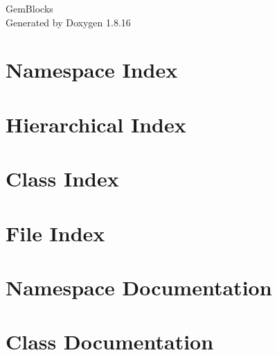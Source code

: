 \let\mypdfximage\pdfximage\def\pdfximage{\immediate\mypdfximage}\documentclass[twoside]{book}
\newcommand{\+}{\discretionary{\mbox{\scriptsize$\hookleftarrow$}}{}{}}
\newcommand{\clearemptydoublepage}{%
  \newpage{\pagestyle{empty}\cleardoublepage}%
}
\begin{document}
\hypersetup{pageanchor=false,
             bookmarksnumbered=true,
             pdfencoding=unicode
            }
\begin{titlepage}
\vspace*{7cm}
\begin{center}%
{\Large Gem\+Blocks }\\
\vspace*{1cm}
{\large Generated by Doxygen 1.8.16}\\
\end{center}
\end{titlepage}
\clearemptydoublepage
{}
\tableofcontents
\clearemptydoublepage
{}
\hypersetup{pageanchor=true}

\chapter{Namespace Index}

\chapter{Hierarchical Index}

\chapter{Class Index}

\chapter{File Index}

\chapter{Namespace Documentation}








\chapter{Class Documentation}



















\end{document}
